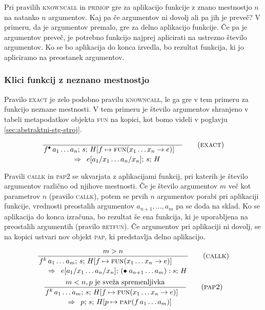 Pri pravilih \textsc{knowncall} in \textsc{primop} gre za aplikacijo funkcije z znano mestnostjo $n$ na natanko $n$ argumentov. Kaj pa če argumentov ni dovolj ali pa jih je preveč? V primeru, da je argumentov premalo, gre za delno aplikacijo funkcije. Če pa je argumentov preveč, je potrebno funkcijo najprej aplicirati na ustrezno število argumentov. Ko se bo aplikacija do konca izvedla, bo rezultat funkcija, ki jo apliciramo na preostanek argumentov.

\subsubsection{Klici funkcij z neznano mestnostjo}

Pravilo \textsc{exact} je zelo podobno pravilu \textsc{knowncall}, le ga gre v tem primeru za funkcijo neznane mestnosti. V tem primeru je število argumentov shranjeno v tabeli metapodatkov objekta \textsc{fun} na kopici, kot bomo videli v poglavju \ref{sec:abstraktni-stg-stroj}.

\begin{equation}
	\linfer[exact]{}{
		f^\bullet \, a_1 \dots a_n ; \, s; \, H[f \mapsto \textsc{fun}(x_1 \dots x_n \to e)]
	}{
		e[a_1 / x_1 \dots a_n / x_n]; \, s; \, H
	}
\end{equation}

Pravili \textsc{callk} in \textsc{pap2} se ukvarjata z aplikacijami funkcij, pri katerih je število argumentov različno od njihove mestnosti. Če je število argumentov $m$ več kot parametrov $n$ (pravilo \textsc{callk}), potem se prvih $n$ argumentov porabi pri aplikaciji funkcije, vrednosti preostalih argumentov $a_{n + 1}, \dots, a_m$ pa se doda na sklad. Ko se aplikacija do konca izračuna, bo rezultat še ena funkcija, ki je uporabljena na preostalih argumentih (pravilo \textsc{retfun}). Če argumentov pri aplikaciji ni dovolj, se na kopici ustvari nov objekt \textsc{pap}, ki predstavlja delno aplikacijo.

\begin{equation}
	\linfer[callk]{
		m > n
	}{
		f^k \, a_1 \dots a_m ; \, s; \, H[f \mapsto \textsc{fun}(x_1 \dots x_n \to e)]
	}{
		e[a_1 / x_1 \dots a_n / x_n]; \, (\bullet \; a_{n + 1} \dots a_m) : s; \, H
	}
\end{equation}
\vspace{1em}
\begin{equation}
	\linfer[pap2]{
		m < n, \text{$p$ je sveža spremenljivka}
	}{
		f^k \, a_1 \dots a_m ; \, s; \, H[f \mapsto \textsc{fun}(x_1 \dots x_n \to e)]
	}{
		p; \, s; \, H[p \mapsto \textsc{pap}(f \, a_1 \dots a_m)]
	}
\end{equation}

